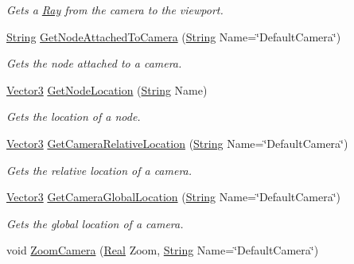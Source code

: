 \begin{DoxyCompactItemize}
\begin{DoxyCompactList}\small\item\em Gets a \hyperlink{classphys_1_1Ray}{Ray} from the camera to the viewport. \item\end{DoxyCompactList}\item 
\hyperlink{namespacephys_aa03900411993de7fbfec4789bc1d392e}{String} \hyperlink{classphys_1_1CameraManager_a52a62fcfbeed45a2f527f626731ddcc1}{GetNodeAttachedToCamera} (\hyperlink{namespacephys_aa03900411993de7fbfec4789bc1d392e}{String} Name=\char`\"{}DefaultCamera\char`\"{})
\begin{DoxyCompactList}\small\item\em Gets the node attached to a camera. \item\end{DoxyCompactList}\item 
\hyperlink{classphys_1_1Vector3}{Vector3} \hyperlink{classphys_1_1CameraManager_af5fcec9bebd90b8e98b0d2f4def97ea1}{GetNodeLocation} (\hyperlink{namespacephys_aa03900411993de7fbfec4789bc1d392e}{String} Name)
\begin{DoxyCompactList}\small\item\em Gets the location of a node. \item\end{DoxyCompactList}\item 
\hyperlink{classphys_1_1Vector3}{Vector3} \hyperlink{classphys_1_1CameraManager_a8557218460fbc94a029f74945fa2517c}{GetCameraRelativeLocation} (\hyperlink{namespacephys_aa03900411993de7fbfec4789bc1d392e}{String} Name=\char`\"{}DefaultCamera\char`\"{})
\begin{DoxyCompactList}\small\item\em Gets the relative location of a camera. \item\end{DoxyCompactList}\item 
\hyperlink{classphys_1_1Vector3}{Vector3} \hyperlink{classphys_1_1CameraManager_a53ef7e8f0a4227a5a35db88fe74772fa}{GetCameraGlobalLocation} (\hyperlink{namespacephys_aa03900411993de7fbfec4789bc1d392e}{String} Name=\char`\"{}DefaultCamera\char`\"{})
\begin{DoxyCompactList}\small\item\em Gets the global location of a camera. \item\end{DoxyCompactList}\item 
void \hyperlink{classphys_1_1CameraManager_aa5a37dbdd45a53bc3dfd4cfa0a94bd42}{ZoomCamera} (\hyperlink{namespacephys_af7eb897198d265b8e868f45240230d5f}{Real} Zoom, \hyperlink{namespacephys_aa03900411993de7fbfec4789bc1d392e}{String} Name=\char`\"{}DefaultCamera\char`\"{})

\end{DoxyCompactItemize}
